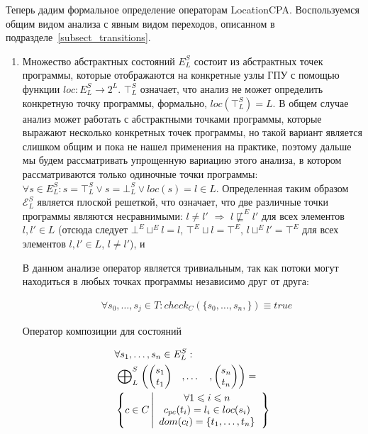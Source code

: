 Теперь дадим формальное определение операторам LocationCPA.
Воспользуемся общим видом анализа с явным видом переходов, описанном в подразделе~\ref{subsect_transitions}.
 
\begin{enumerate}

\item 
Множество абстрактных состояний $E^S_L$ состоит из абстрактных точек программы, которые отображаются на конкретные узлы ГПУ с помощью функции $loc: E^S_L \rightarrow 2^L$.
$\top^S_L$ означает, что анализ не может определить конкретную точку программы, формально, $loc(\top^S_L) = L$.
В общем случае анализ может работать с абстрактными точками программы, которые выражают несколько конкретных точек программы, но такой вариант является слишком общим и пока не нашел применения на практике, поэтому дальше мы будем рассматривать упрощенную вариацию этого анализа, в котором рассматриваются только одиночные точки программы: $\forall s \in E^S_L: s = \top^S_L \lor s=\bot^S_L \lor loc(s) = l \in L$.
Определенная таким образом $\mathcal{E}^S_L$ является плоской решеткой, что означает, что две различные точки программы являются несравнимыми: $l \neq l'$ $\Rightarrow$ $l \not\sqsubseteq^E l'$ для всех элементов $l, l' \in L$ 
(отсюда следует $\bot^E \sqcup^E l = l$, $\top^E \sqcup l=\top^E$, $ l\sqcup^E l' = \top^E$ для всех элементов $l,l'\in L$, $l\neq l'$), 
и

В данном анализе оператор является тривиальным, так как потоки могут находиться в любых точках программы независимо друг от друга:

\begin{align*}
& \forall s_0, \dots, s_j \in T: check_C(\{s_0, \dots, s_n,\}) \equiv true
\end{align*}

Оператор композиции для состояний

\begin{equation}
\label{location_epp_def}
\begin{aligned}
&\forall s_1, \dots, s_n \in E^S_L:\\
&\mathrel{\bigoplus}^S_{L}
\begin{pmatrix}
\begin{pmatrix}
s_1 \\
t_1 
\end{pmatrix}& ,
\dots& ,
\begin{pmatrix}
s_n \\
t_n 
\end{pmatrix}
\end{pmatrix} = \\
& \left\lbrace c \in C 
\left| 
\begin{array}{c}
\forall 1 \leqslant i \leqslant n \\
c_{pc}(t_i) = l_i \in loc(s_i) \\
dom(c_l) = \{t_1, \dots, t_n\}\\
\end{array}
\right.
\right\rbrace\\
\end{aligned}
\end{equation}


\end{enumerate}
